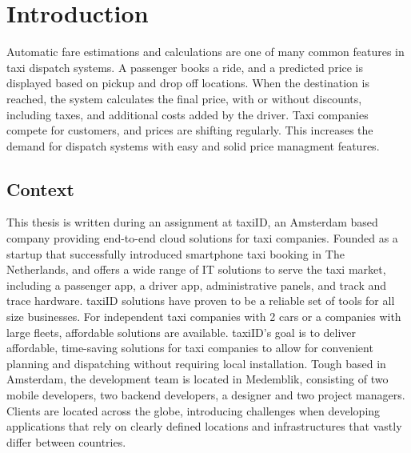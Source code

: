 %
\section{Introduction}
Automatic fare estimations and calculations are one of many common features in taxi dispatch systems. A passenger books a ride, and a predicted price is displayed based on pickup and drop off locations. When the destination is reached, the system calculates the final price, with or without discounts, including taxes, and additional costs added by the driver. Taxi companies compete for customers, and prices are shifting regularly. This increases the demand for dispatch systems with easy and solid price managment features.

%
\subsection{Context}
This thesis is written during an assignment at taxiID, an Amsterdam based company providing end-to-end cloud solutions for taxi companies. Founded as a startup that successfully introduced smartphone taxi booking in The Netherlands, and offers a wide range of IT solutions to serve the taxi market, including a passenger app, a driver app, administrative panels, and track and trace hardware. taxiID solutions have proven to be a reliable set of tools for all size businesses. For independent taxi companies with 2 cars or a companies with large fleets, affordable solutions are available. taxiID's goal is to deliver affordable, time-saving solutions for taxi companies to allow for convenient planning and dispatching without requiring local installation. Tough based in Amsterdam, the development team is located in Medemblik, consisting of two mobile developers, two backend developers, a designer and two project managers. Clients are located across the globe, introducing challenges when developing applications that rely on clearly defined locations and infrastructures that vastly differ between countries.

%
